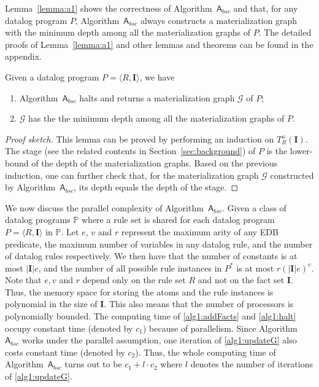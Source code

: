 \documentclass[final,1p,times]{elsarticle}
\begin{document}
Lemma~\ref{lemma:a1} shows the correctness of Algorithm~$\mathsf{A}_{bsc}$ and that, for any datalog program $P$,
Algorithm~$\mathsf{A}_{bsc}$ always constructs a materialization graph with the minimum depth among all the
materialization graphs of $P$. The detailed proofs of Lemma~\ref{lemma:a1} and other lemmas and theorems can be found
in the appendix.

\begin{lemma}
\label{lemma:a1}
Given a datalog program $P=\langle R, \textbf{I}\rangle$, we have
\begin{enumerate}[leftmargin=4ex]
\item Algorithm~$\mathsf{A}_{bsc}$ halts and returns a materialization graph $\mathcal{G}$ of $P$;
\item $\mathcal{G}$ has the the minimum depth among all the materialization graphs of $P$.
\end{enumerate}
\end{lemma}

\begin{proof}[Proof sketch] This lemma can be proved by performing
an induction on $T_R^{\omega}(\textbf{I})$.
The stage (see the related contents in Section~\ref{sec:background}) of $P$
is the lower-bound of the depth of the materialization graphs. Based on the previous induction,
one can further check that, for the materialization graph $\mathcal{G}$ constructed by Algorithm~$\mathsf{A}_{bsc}$,
its depth equals the depth of the stage.
\end{proof}

We now discuss the parallel complexity of Algorithm~$\mathsf{A}_{bsc}$.
Given a class of datalog programs $\mathbb{P}$ where
a rule set is shared for each datalog program $P=\langle R, \textbf{I}\rangle$ in $\mathbb{P}$.
Let $e$, $v$ and $r$ represent the maximum arity of any EDB predicate, the maximum number of variables
in any datalog rule, and the number of datalog rules respectively.
We then have that the number of
constants is at most $|\textbf{I}|e$, and the number of all possible rule instances in $P^*$
is at most $r(|\textbf{I}|e)^v$.
Note that $e, v$ and $r$ depend only on the rule set $R$ and not on the fact set $\textbf{I}$.
Thus, the memory space for storing the atoms and the rule instances is polynomial in the size of $\textbf{I}$.
This also means that the number of processors is polynomially bounded.
The computing time of \ref{alg1:addFacts} and \ref{alg1:halt} occupy constant time (denoted by $c_1$) because of parallelism.
Since Algorithm~$\mathsf{A}_{bsc}$ works under the parallel assumption, one iteration of
\ref{alg1:updateG} also costs constant time (denoted by $c_2$). Thus, 
the whole computing time of Algorithm~$\mathsf{A}_{bsc}$ turns out to be $c_1+l\cdot c_2$
where $l$ denotes the number of iterations of \ref{alg1:updateG}.
\end{document}
